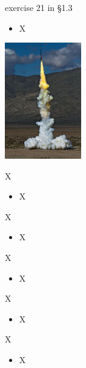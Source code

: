 \documentclass{beamer}
\begin{document}
\begin{frame}{exercise 21 in \S 1.3}

\begin{itemize}
\item X
\end{itemize}

\includegraphics[width=0.25\textwidth]{exercise-21-1-3}
\end{frame}


\begin{frame}{X}

\begin{itemize}
\item X
\end{itemize}
\end{frame}


\begin{frame}{X}

\begin{itemize}
\item X
\end{itemize}
\end{frame}


\begin{frame}{X}

\begin{itemize}
\item X
\end{itemize}
\end{frame}


\begin{frame}{X}

\begin{itemize}
\item X
\end{itemize}
\end{frame}


\begin{frame}{X}

\begin{itemize}
\item X
\end{itemize}
\end{frame}
\end{document}
